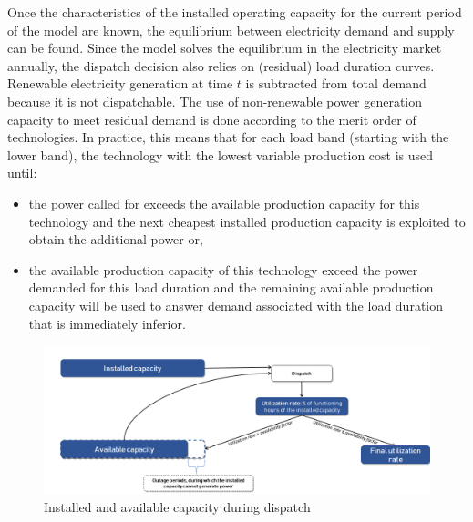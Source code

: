 

Once the characteristics of the installed operating capacity for the current period of the model are known, the equilibrium between electricity demand and supply can be found.
Since the model solves the equilibrium in the electricity market annually, the dispatch decision also relies on (residual) load duration curves. Renewable electricity generation at time $t$ is subtracted from total demand because it is not dispatchable.
The use of non-renewable power generation capacity to meet residual demand is done according to the merit order of technologies.
In practice, this means that for each load band (starting with the lower band), the technology with the lowest variable production cost is used until:


\begin{itemize}
    \item the power called for exceeds the available production capacity for this technology and the next cheapest installed production capacity is exploited to obtain the additional power or,
    \item the available production capacity of this technology exceed the power demanded for this load duration and the remaining available production capacity will be used to answer demand associated with the load duration that is immediately inferior.
\end{itemize}

\begin{figure}[H]
    \centerline{\includegraphics[scale=0.6]{figures&tables/availb.png}}
    \caption{Installed and available capacity during dispatch}
    \label{fig:avail}
\end{figure}


